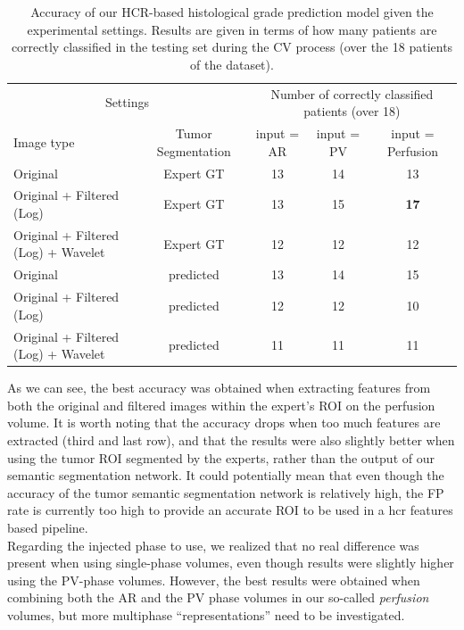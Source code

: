 {\renewcommand{\arraystretch}{2}
\begin{table}[!htp]
\begin{mdframed}[backgroundcolor=blue!50,linecolor=blue!50]
\centering
\caption{Accuracy of our HCR-based histological grade prediction model given the experimental settings. Results are given in terms of how many patients are correctly classified in the testing set during the CV process (over the 18 patients of the dataset).}\label{tab:hcrGrade}
\scriptsize
\begin{tabular}{lcccc}\toprule
\multicolumn{2}{c}{Settings} &\multicolumn{3}{c}{Number of correctly classified patients (over 18)} \\\cmidrule{1-5}
Image type &Tumor Segmentation & input = AR &input = PV &input = Perfusion \\\midrule
Original & Expert GT & 13  & 14  & 13  \\
Original + Filtered (Log) & Expert GT & 13  &15  & \textbf{17}  \\
Original + Filtered (Log) + Wavelet & Expert GT & 12  & 12  & 12  \\
Original & predicted & 13  & 14  &15  \\
Original + Filtered (Log) & predicted &12  & 12  & 10  \\
Original + Filtered (Log) + Wavelet & predicted & 11  & 11  &11  \\
\bottomrule
\end{tabular}
\end{mdframed}
\end{table}
\renewcommand{\arraystretch}{5}
As we can see, the best accuracy was obtained when extracting features from both the original and filtered images within the expert's ROI on the perfusion volume. It is worth noting that the accuracy drops when too much features are extracted (third and last row), and that the results were also slightly better when using the tumor ROI segmented by the experts, rather than the output of our semantic segmentation network. It could potentially mean that even though the accuracy of the tumor semantic segmentation network is relatively high, the FP rate is currently too high to provide an accurate ROI to be used in a \ac{hcr} features based pipeline.\\
Regarding the injected phase to use, we realized that no real difference was present when using single-phase volumes, even though results were slightly higher using the PV-phase volumes. However, the best results were obtained when combining both the AR and the PV phase volumes in our so-called \textit{perfusion} volumes, but more multiphase ``representations'' need to be investigated.
}
